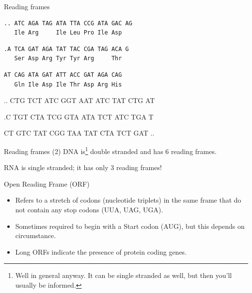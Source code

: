 \documentclass[pdf]{beamer}
\begin{document}
\begin{frame}[fragile]{Reading frames}
{\begin{description}
\begin{verbatim}
.. ATC AGA TAG ATA TTA CCG ATA GAC AG
   Ile Arg     Ile Leu Pro Ile Asp  \end{verbatim}
    \item<3->[frame 2]
      \begin{verbatim} 
.A TCA GAT AGA TAT TAC CGA TAG ACA G  
   Ser Asp Arg Tyr Tyr Arg     Thr
\end{verbatim}
    \item<4->[frame 3]
      \begin{verbatim}
AT CAG ATA GAT ATT ACC GAT AGA CAG 
   Gln Ile Asp Ile Thr Asp Arg His
\end{verbatim}
    \item<5->[frame -1]
      \begin{semiverbatim} .. CTG TCT ATC GGT AAT ATC TAT CTG AT \end{semiverbatim}
    \item<5->[frame -2]
      \begin{semiverbatim} .C TGT CTA TCG GTA ATA TCT ATC TGA T \end{semiverbatim}
    \item<5->[frame -3]
      \begin{semiverbatim} CT GTC TAT CGG TAA TAT CTA TCT GAT .. \end{semiverbatim}
  \end{description}
}
\end{frame}

\begin{frame}{Reading frames (2)}
  DNA is\footnote{Well in general anyway. It can be single stranded as well,
    but then you'll usually be informed.}
  double stranded and has 6 reading frames.
  \vspace{3ex}

  RNA is single stranded; it has only 3 reading frames!
\end{frame}

\begin{frame}{Open Reading Frame (ORF)}
  \begin{itemize}
    \item Refers to a stretch of codons (nucleotide triplets) in the same frame that
      do not contain any stop codons (UUA, UAG, UGA).
    \item Sometimes required to begin with a Start codon (AUG), but this depends on circumstance.
    \item Long ORFs indicate the presence of protein coding genes.
  \end{itemize}
\end{frame}
\end{document}
